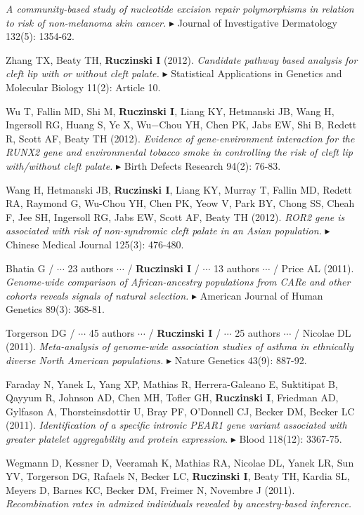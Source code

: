 \documentclass[10pt]{article}
\newcommand{\mine}{
  \addtocounter{enumi}{1}
\item[\fcolorbox{white}{grey}{\color{white} \tiny \arabic{enumi}}]
}
\newcommand{\dg}[1]{{\color{black} $\blacktriangleright$ {#1}}}
\begin{document}
{\it A community-based study of nucleotide excision repair polymorphisms in relation to risk of non-melanoma skin cancer.}
\dg{Journal of Investigative Dermatology} 132(5): 1354-62.
\mine
Zhang TX, Beaty TH, {\bf Ruczinski I} (2012).
{\it Candidate pathway based analysis for cleft lip with or without cleft palate.} 
\dg{Statistical Applications in Genetics and Molecular Biology} 11(2): Article 10. 
\item 
Wu T, Fallin MD, Shi M, {\bf Ruczinski I}, Liang KY, Hetmanski JB, Wang H, Ingersoll RG, Huang S, Ye X, Wu−Chou YH, Chen PK, Jabs EW, Shi B, Redett R, Scott AF, Beaty TH (2012). 
{\it Evidence of gene-environment interaction for the RUNX2 gene and environmental tobacco smoke in controlling the risk of cleft lip with/without cleft palate.} 
\dg{Birth Defects Research} 94(2): 76-83.
\item 
Wang H, Hetmanski JB, {\bf Ruczinski I}, Liang KY, Murray T, Fallin MD, Redett RA, Raymond G, Wu-Chou YH, Chen PK, Yeow V, Park BY, Chong SS, Cheah F, Jee SH, Ingersoll RG, Jabs EW, Scott AF, Beaty TH (2012).
{\it ROR2 gene is associated with risk of non-syndromic cleft palate in an Asian population.}
\dg{Chinese Medical Journal} 125(3): 476-480.
\item 
Bhatia G / $\cdots$ 23 authors $\cdots$ / {\bf Ruczinski I} / $\cdots$ 13 authors $\cdots$ / Price AL (2011).
{\it Genome-wide comparison of African-ancestry populations from CARe and other cohorts reveals signals of natural selection.}
\dg{American Journal of Human Genetics} 89(3): 368-81.
\item 
Torgerson DG / $\cdots$ 45 authors $\cdots$ / {\bf Ruczinski I} / $\cdots$ 25 authors $\cdots$ / Nicolae DL (2011).
{\it Meta-analysis of genome-wide association studies of asthma in ethnically diverse North American populations.}
\dg{Nature Genetics} 43(9): 887-92.
\item 
Faraday N, Yanek L, Yang XP, Mathias R, Herrera-Galeano E, Suktitipat B, Qayyum R, Johnson AD, Chen MH, Tofler GH, {\bf Ruczinski I}, Friedman AD, Gylfason A, Thorsteinsdottir U, Bray PF, O'Donnell CJ, Becker DM, Becker LC (2011).
{\it Identification of a specific intronic PEAR1 gene variant associated with greater platelet aggregability and protein expression}.
\dg{Blood} 118(12): 3367-75. 
\item 
Wegmann D, Kessner D, Veeramah K, Mathias RA, Nicolae DL, Yanek LR, Sun YV, Torgerson DG, Rafaels N, Becker LC, {\bf Ruczinski I}, Beaty TH, Kardia SL, Meyers D, Barnes KC, Becker DM, Freimer N, Novembre J (2011).
{\it Recombination rates in admixed individuals revealed by ancestry-based inference.}
\end{document}

